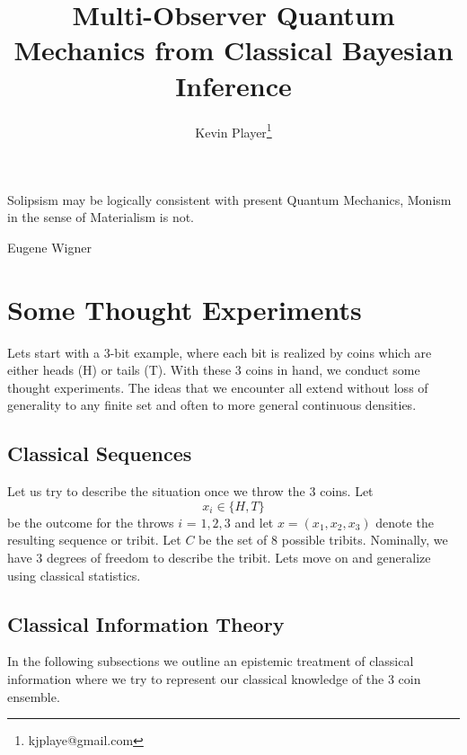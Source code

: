 \documentclass[12pt,a4paper]{article}
\theoremstyle{myrule}
\begin{document}
\title{Multi-Observer Quantum Mechanics from Classical Bayesian Inference}
\author[1]{Kevin Player\footnote{kjplaye@gmail.com}}

\maketitle


\epigraph{Solipsism may be logically consistent with present Quantum Mechanics, Monism in the sense of Materialism is not.}{Eugene Wigner}


\section{Some Thought Experiments}
Lets start with a 3-bit example, where each bit is realized by coins which are either heads (H) or tails (T).  With these 3 coins in hand, we conduct some thought experiments.  The ideas that we encounter all extend without loss of generality to any finite set and often to more general continuous densities.
\subsection{Classical Sequences}
Let us try to describe the situation once we throw the 3 coins.  Let
\[
x_i \in \{H,T\}
\]
be the outcome for the throws $i$ = $1,2,3$ and let $x = (x_1, x_2, x_3)$ denote the resulting sequence or tribit.  Let $C$ be the set of 8 possible tribits.  Nominally, we have 3 degrees of freedom to describe the tribit.  Lets move on and generalize using classical statistics.
  
\subsection{Classical Information Theory}
In the following subsections we outline an epistemic treatment of classical information where we try to represent our classical knowledge of the 3 coin ensemble.
\end{document}
